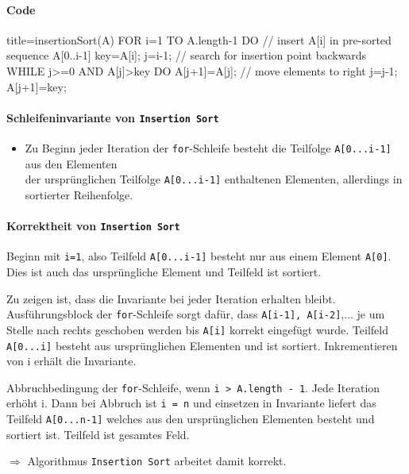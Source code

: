 \documentclass[
    ngerman,
    color=3b,
    dark_mode,
    summary,
    boxarc,
]{rubos-tuda-template}
\begin{document}
\paragraph{Code}\mbox{}
\begin{codeBlock}[autogobble]{title=insertionSort(A)}
    FOR i=1 TO A.length-1 DO
        // insert A[i] in pre-sorted sequence A[0..i-1]
        key=A[i];
        j=i-1; // search for insertion point backwards
        WHILE j>=0 AND A[j]>key DO
            A[j+1]=A[j]; // move elements to right
            j=j-1;
        A[j+1]=key;
\end{codeBlock}

\paragraph{Schleifeninvariante von \texttt{Insertion Sort}}\label{insSortSiv}
\begin{itemize}
    \item Zu Beginn jeder Iteration der \texttt{for}-Schleife besteht die Teilfolge \texttt{A[0...i-1]} aus den Elementen \\
          der ursprünglichen Teilfolge \texttt{A[0...i-1]} enthaltenen Elementen, allerdings in sortierter Reihenfolge.
\end{itemize}

\paragraph{Korrektheit von \texttt{Insertion Sort}}
\begin{description}[leftmargin=3cm,itemsep=1em]
    \item [Initialisierung]
          Beginn mit \texttt{i=1}, also Teilfeld \texttt{A[0...i-1]} besteht nur aus einem Element \texttt{A[0]}. \\
          Dies ist auch das ursprüngliche Element und Teilfeld ist sortiert.
    \item [Fortsetzung]
          Zu zeigen ist, dass die Invariante bei jeder Iteration erhalten bleibt. Ausführungsblock der \texttt{for}-Schleife
          sorgt dafür, dass \texttt{A[i-1], A[i-2]},... je um Stelle nach rechts geschoben werden bis \texttt{A[i]} korrekt eingefügt wurde.
          Teilfeld \texttt{A[0...i]} besteht aus ursprünglichen Elementen und ist sortiert. Inkrementieren von i erhält die Invariante.
    \item [Terminierung]
          Abbruchbedingung der \texttt{for}-Schleife, wenn \texttt{i > A.length - 1}. Jede Iteration erhöht i.
          Dann bei Abbruch ist \texttt{i = n} und einsetzen in Invariante liefert das Teilfeld \texttt{A[0...n-1]}
          welches aus den ursprünglichen Elementen besteht und sortiert ist. Teilfeld ist gesamtes Feld.
\end{description}
$\Longrightarrow$ Algorithmus \texttt{Insertion Sort} arbeitet damit korrekt.
\clearpage
\end{document}
